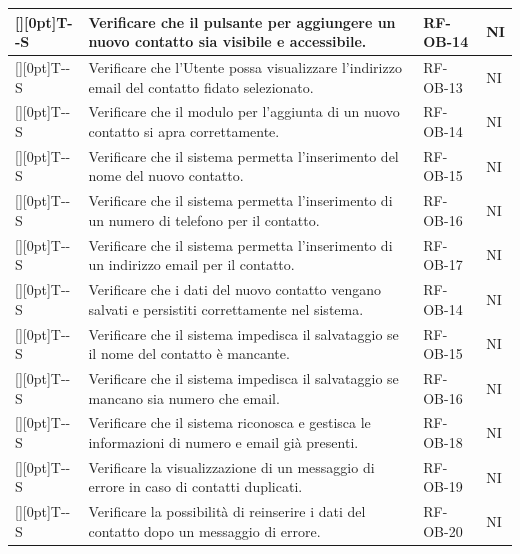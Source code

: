 \documentclass[a4paper,12pt]{article}
\newcounter{testsys}
\newcommand{\systestcode}{%
  \raisebox{0pt}[\height][0pt]{\hypertarget{T-\arabic{testsys}-S}{}}T-\arabic{testsys}-S%
}
\begin{document}
\begin{longtable}{| >{\centering\arraybackslash}p{} | >{\raggedright\arraybackslash}p{} | >{\centering\arraybackslash}p{} | >{\centering\arraybackslash}p{} |}
\stepcounter{testsys} \systestcode & Verificare che il pulsante per aggiungere un nuovo contatto sia visibile e accessibile. & RF-OB-14 & NI \\
\hline

\stepcounter{testsys} \systestcode & Verificare che l'Utente possa visualizzare l'indirizzo email del contatto fidato selezionato. & RF-OB-13 & NI \\
\hline

\stepcounter{testsys} \systestcode & Verificare che il modulo per l'aggiunta di un nuovo contatto si apra correttamente. & RF-OB-14 & NI \\
\hline

\stepcounter{testsys} \systestcode & Verificare che il sistema permetta l'inserimento del nome del nuovo contatto. & RF-OB-15 & NI \\
\hline

\stepcounter{testsys} \systestcode & Verificare che il sistema permetta l'inserimento di un numero di telefono per il contatto. & RF-OB-16 & NI \\
\hline

\stepcounter{testsys} \systestcode & Verificare che il sistema permetta l'inserimento di un indirizzo email per il contatto. & RF-OB-17 & NI \\
\hline

\stepcounter{testsys} \systestcode & Verificare che i dati del nuovo contatto vengano salvati e persistiti correttamente nel sistema. & RF-OB-14 & NI \\
\hline

\stepcounter{testsys} \systestcode & Verificare che il sistema impedisca il salvataggio se il nome del contatto è mancante. & RF-OB-15 & NI \\
\hline

\stepcounter{testsys} \systestcode & Verificare che il sistema impedisca il salvataggio se mancano sia numero che email. & RF-OB-16 & NI \\
\hline

\stepcounter{testsys} \systestcode & Verificare che il sistema riconosca e gestisca le informazioni di numero e email già presenti. & RF-OB-18 & NI \\
\hline

\stepcounter{testsys} \systestcode & Verificare la visualizzazione di un messaggio di errore in caso di contatti duplicati. & RF-OB-19 & NI \\
\hline

\stepcounter{testsys} \systestcode & Verificare la possibilità di reinserire i dati del contatto dopo un messaggio di errore. & RF-OB-20 & NI \\
\hline


\end{longtable}
\end{document}
